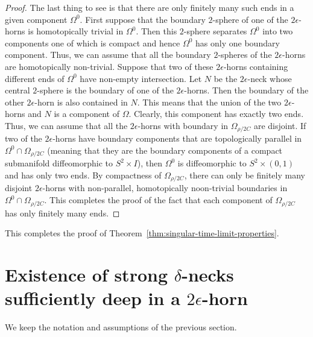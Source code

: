 \begin{proof}
 The last thing to see is
that there are only finitely many such ends in a given component
$\Omega^0$. First suppose that the boundary $2$-sphere of one of the
$2\epsilon$-horns is homotopically trivial in $\Omega^0$. Then this
$2$-sphere separates $\Omega^0$ into two components one of which is
compact and hence $\Omega^0$ has only one boundary component. Thus,
we can assume that all the boundary $2$-spheres of the
$2\epsilon$-horns are homotopically non-trivial. Suppose that two of
these $2\epsilon$-horns containing different ends of $\Omega^0$ have
non-empty intersection. Let $N$ be the $2\epsilon$-neck whose
central $2$-sphere is the boundary of one of the $2\epsilon$-horns.
Then the boundary of the other $2\epsilon$-horn is also contained in
$N$. This means that
 the
union of the two $2\epsilon$-horns and $N$ is a component of
$\Omega$. Clearly, this component has exactly two
ends. Thus, we can assume that all the $2\epsilon$-horns with
boundary in $\Omega_{\rho/2C}$ are disjoint. If two of the
$2\epsilon$-horns have boundary components that are topologically
parallel in $\Omega^0\cap \Omega_{\rho/2C}$ (meaning that they are
the boundary components of a compact submanifold diffeomorphic to
$S^2\times I$), then $\Omega^0$ is diffeomorphic to $S^2\times
(0,1)$ and has only two ends.
 By compactness of
$\Omega_{\rho/2C}$, there can only be finitely many disjoint
$2\epsilon$-horns with non-parallel, homotopically noon-trivial
boundaries in $\Omega^0\cap \Omega_{\rho/2C}$. This completes the
proof of the fact that each component of $\Omega_{\rho/2C}$ has only
finitely many ends.
\end{proof}


This completes the proof of Theorem~\ref{thm:singular-time-limit-properties}.


\section{Existence of strong $\delta$-necks sufficiently deep in
a $2\epsilon$-horn}


We keep the notation and assumptions of the previous section.

